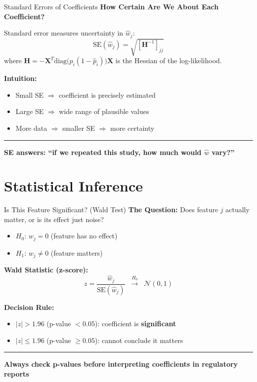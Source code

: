 \documentclass[8pt,aspectratio=169]{beamer}
\newcommand{\bottomnote}[1]{%
\vfill
\vspace{-2mm}
\textcolor{mllavender2}{\rule{\textwidth}{0.4pt}}
\vspace{1mm}
\footnotesize
\textbf{#1}
}
\begin{document}
\begin{frame}[t]{Standard Errors of Coefficients}
\textbf{How Certain Are We About Each Coefficient?}

Standard error measures uncertainty in $\hat{w}_j$:
\begin{equation}
  \text{SE}(\hat{w}_j) = \sqrt{[\mathbf{H}^{-1}]_{jj}}
\end{equation}
where $\mathbf{H} = -\mathbf{X}^T\text{diag}\bigl(\hat{p}_i(1-\hat{p}_i)\bigr)\mathbf{X}$ is the Hessian of the log-likelihood.

\vspace{0.3em}
\textbf{Intuition:}
\begin{itemize}
  \item Small SE $\Rightarrow$ coefficient is precisely estimated
  \item Large SE $\Rightarrow$ wide range of plausible values
  \item More data $\Rightarrow$ smaller SE $\Rightarrow$ more certainty
\end{itemize}
\bottomnote{SE answers: ``if we repeated this study, how much would $\hat{w}$ vary?''}
\end{frame}

\section{Statistical Inference}

\begin{frame}[t]{Is This Feature Significant? (Wald Test)}
\textbf{The Question:} Does feature $j$ actually matter, or is its effect just noise?

\begin{itemize}
  \item $H_0$: $w_j = 0$ (feature has no effect)
  \item $H_1$: $w_j \neq 0$ (feature matters)
\end{itemize}

\textbf{Wald Statistic (z-score):}
\begin{equation}
  z = \frac{\hat{w}_j}{\text{SE}(\hat{w}_j)} \;\;\xrightarrow{H_0}\;\; \mathcal{N}(0,1)
\end{equation}

\textbf{Decision Rule:}
\begin{itemize}
  \item $|z| > 1.96$ (p-value $< 0.05$): coefficient is \textbf{significant}
  \item $|z| \leq 1.96$ (p-value $\geq 0.05$): cannot conclude it matters
\end{itemize}
\bottomnote{Always check p-values before interpreting coefficients in regulatory reports}
\end{frame}
\end{document}
